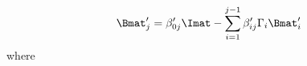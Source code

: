 \begin{equation}
\Bmat'_{j} = \beta_{0j}' \Imat  - \sum\limits^{j-1}_{i = 1} \beta'_{ij} \Gamma_i \Bmat'_i
\end{equation}
where